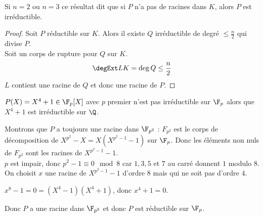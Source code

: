 \begin{remarque}
	Si $n = 2$ ou $n = 3$ ce résultat dit que si $P$ n'a pas de racines dans $K$, alors $P$ est irréductible.
\end{remarque}


\begin{proof}
	Soit $P$ réductible sur $K$. Alors il existe $Q$ irréductible de degré $\leq \frac{n}{2}$ qui divise $P$.\\
	Soit un corps de rupture pour $Q$ sur $K$.\\
	$$\degExt L K = \deg Q \leq \frac{n}{2}$$
	$L$ contient une racine de $Q$ et donc une racine de $P$.
\end{proof}



\begin{exemple}
	$P(X) = X^4 + 1 \in \F_p[X]$ avec $p$ premier n'est pas irréductible sur $\F_p$ alors que $X^4 + 1$ est irréductible sur $\Q$.

	Montrons que $P$ a toujours une racine dans $\F_{p^2}$ :
	$F_{p^2}$ est le corps de décomposition de $X^{p^2} - X = X (X^{p^2-1} - 1)$ sur $\F_p$.
	Donc les éléments non nuls de $F_{p^2}$ sont les racines de $X^{p^2-1} - 1$.\\
	$p$ est impair, donc $p^2 - 1 \equiv 0 \mod 8$ car $1,3,5$ et $7$ au carré donnent $1$ modulo $8$.\\

	On choisit $x$ une racine de $X^{p^2-1} - 1$ d'ordre $8$ mais qui ne soit pas d'ordre $4$.

	$x^8-1 = 0 = (X^4-1)(X^4+1)$, donc $x^4 + 1 = 0$.

	Donc $P$ a une racine dans $\F_{p^2}$ et donc $P$ est réductible sur $\F_p$.
\end{exemple}



